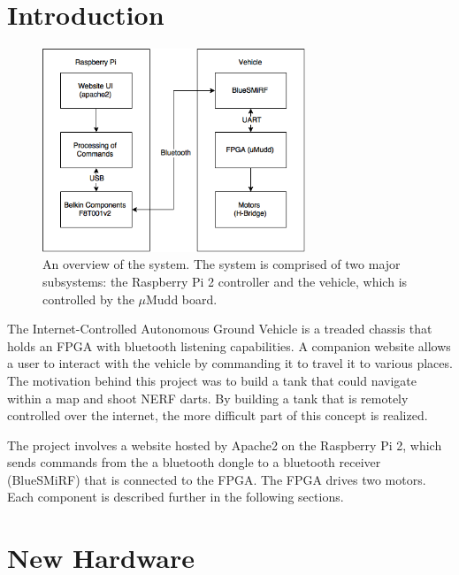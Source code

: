 \documentclass[12pt]{article}
\begin{document}
\newpage

\tableofcontents

\newpage


\section{Introduction}

\begin{figure}[b!]
\begin{center}
\includegraphics[width=0.7\textwidth]{E155System}
\end{center}
\caption{An overview of the system. The system is comprised of two major subsystems: the Raspberry Pi 2 controller and the vehicle, which is controlled by the $\mu$Mudd board.}
\label{fig:sys}
\end{figure}

The Internet-Controlled Autonomous Ground Vehicle is a treaded chassis that holds an FPGA with bluetooth listening capabilities. A companion website allows a user to interact with the vehicle by commanding it to travel it to various places. The motivation behind this project was to build a tank that could navigate within a map and shoot NERF darts. By building a tank that is remotely controlled over the internet, the more difficult part of this concept is realized.

The project involves a website hosted by Apache2 on the Raspberry Pi 2, which sends commands from the a bluetooth dongle to a bluetooth receiver (BlueSMiRF) that is connected to the FPGA. The FPGA drives two motors. Each component is described further in the following sections.

\section{New Hardware}
\end{document}

